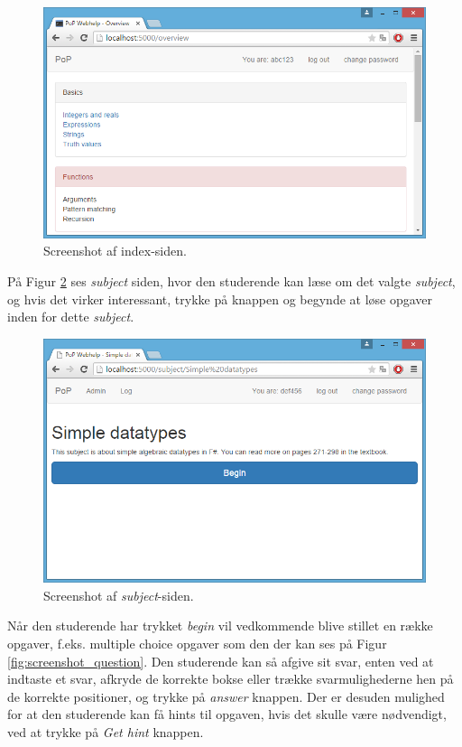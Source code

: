 \documentclass[11pt, a4paper]{article}
\begin{document}
\begin{figure}[htpb]
    \centering
    \includegraphics[width=1\linewidth]{figures/interface/overview.png}
    \caption{Screenshot af index-siden.}
    \label{fig:screenshot_overview}
\end{figure}

På Figur \ref{fig:screenshot_subject} ses \emph{subject} siden, hvor den studerende kan læse om det valgte \emph{subject}, og hvis det virker interessant, trykke på knappen og begynde at løse opgaver inden for dette \emph{subject}.

\begin{figure}[htpb]
    \centering
    \includegraphics[width=1\linewidth]{figures/interface/subject.png}
    \caption{Screenshot af \emph{subject}-siden.}
    \label{fig:screenshot_subject}
\end{figure}

Når den studerende har trykket \emph{begin} vil vedkommende blive stillet en række opgaver, f.eks. multiple choice opgaver som den der kan ses på Figur \ref{fig:screenshot_question}. Den studerende kan så afgive sit svar, enten ved at indtaste et svar, afkryde de korrekte bokse eller trække svarmulighederne hen på de korrekte positioner, og trykke på \emph{answer} knappen. Der er desuden mulighed for at den studerende kan få hints til opgaven, hvis det skulle være nødvendigt, ved at trykke på \emph{Get hint} knappen.
\end{document}
